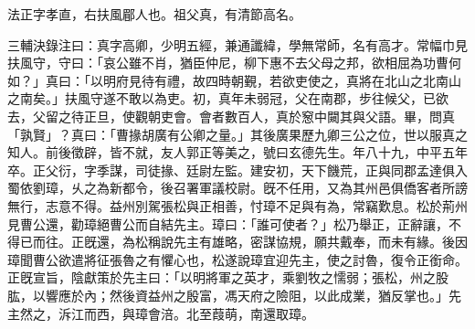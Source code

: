 
\begin{pinyinscope}
法正字孝直，右扶風郿人也。祖父真，有清節高名。

三輔決錄注曰：真字高卿，少明五經，兼通讖緯，學無常師，名有高才。常幅巾見扶風守，守曰：「哀公雖不肖，猶臣仲尼，柳下惠不去父母之邦，欲相屈為功曹何如？」真曰：「以明府見待有禮，故四時朝覲，若欲吏使之，真將在北山之北南山之南矣。」扶風守遂不敢以為吏。初，真年未弱冠，父在南郡，步往候父，已欲去，父留之待正旦，使觀朝吏會。會者數百人，真於䆫中闚其與父語。畢，問真「孰賢」？真曰：「曹掾胡廣有公卿之量。」其後廣果歷九卿三公之位，世以服真之知人。前後徵辟，皆不就，友人郭正等美之，號曰玄德先生。年八十九，中平五年卒。正父衍，字季謀，司徒掾、廷尉左監。建安初，天下饑荒，正與同郡孟達俱入蜀依劉璋，乆之為新都令，後召署軍議校尉。旣不任用，又為其州邑俱僑客者所謗無行，志意不得。益州別駕張松與正相善，忖璋不足與有為，常竊歎息。松於荊州見曹公還，勸璋絕曹公而自結先主。璋曰：「誰可使者？」松乃舉正，正辭讓，不得已而往。正旣還，為松稱說先主有雄略，密謀協規，願共戴奉，而未有緣。後因璋聞曹公欲遣將征張魯之有懼心也，松遂說璋宜迎先主，使之討魯，復令正銜命。正旣宣旨，陰獻策於先主曰：「以明將軍之英才，乘劉牧之懦弱；張松，州之股肱，以響應於內；然後資益州之殷富，馮天府之險阻，以此成業，猶反掌也。」先主然之，泝江而西，與璋會涪。北至葭萌，南還取璋。


\end{pinyinscope}
